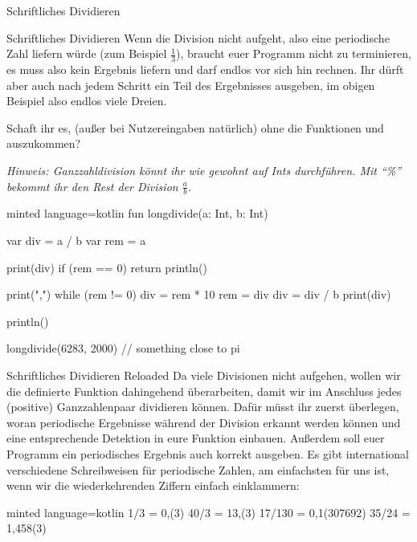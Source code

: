 \begin{task}[points=auto]{Schriftliches Dividieren}
\begin{subtask*}[points=0]{Schriftliches Dividieren }
        Wenn die Division nicht aufgeht, also eine periodische Zahl liefern würde (zum Beispiel $\frac13$), braucht euer Programm nicht zu terminieren, es muss also kein Ergebnis liefern und darf endlos vor sich hin rechnen.
        Ihr dürft aber auch nach jedem Schritt ein Teil des Ergebnisses ausgeben,
        im obigen Beispiel also endlos viele Dreien.

        Schaft ihr es, (außer bei Nutzereingaben natürlich) ohne die Funktionen
         und  auszukommen?

        \textit{Hinweis: Ganzzahldivision könnt ihr wie gewohnt auf Ints durchführen.
            Mit \enquote{\%} bekommt ihr den Rest der Division $\frac{a}{b}$.}

        \begin{solution}
            \begin{codeBlock}[]{minted language=kotlin}
                fun longdivide(a: Int, b: Int) {
                    var div = a / b
                    var rem = a %

                    print(div)
                    if (rem == 0) {
                        return
                        println()
                    }

                    print(",")
                    while (rem != 0) {
                        div = rem * 10
                        rem = div %
                        div = div / b
                        print(div)
                    }

                    println()
                }

                longdivide(6283, 2000) // something close to pi
            \end{codeBlock}
        \end{solution}
    \end{subtask*}
    \begin{subtask*}[points=0]{Schriftliches Dividieren Reloaded }
        Da viele Divisionen nicht aufgehen, wollen wir die definierte Funktion dahingehend überarbeiten, damit wir im Anschluss jedes (positive) Ganzzahlenpaar dividieren können.
        Dafür müsst ihr zuerst überlegen, woran periodische Ergebnisse während der Division erkannt werden können und eine entsprechende Detektion in eure Funktion einbauen.
        Außerdem soll euer Programm ein periodisches Ergebnis auch korrekt ausgeben. Es gibt international verschiedene Schreibweisen für periodische Zahlen, am einfachsten für uns ist, wenn wir die wiederkehrenden Ziffern einfach einklammern:
        \begin{codeBlock}[]{minted language=kotlin}
            1/3 = 0,(3)
            40/3 = 13,(3)
            17/130 = 0,1(307692)
            35/24 = 1,458(3)
        \end{codeBlock}


\end{subtask*}
\end{task}

